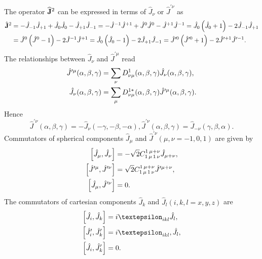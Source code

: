 The operator $\widehat{\mathbf{J}}^{2}$ can be expressed in terms of $\widehat{J}_{\nu}$ or $\widehat{J}^{\prime \nu}$ as
\begin{align}
\hat{\mathbf{J}}^{2} & =-\hat{J}_{-1} \hat{J}_{+1}+\hat{J}_{0} \hat{J}_{0}-\hat{J}_{+1} \hat{J}_{-1}=-\hat{J}^{-1} \hat{J}^{+1}+\hat{J}^{0} \hat{J}^{0}-\hat{J}^{+1} \hat{J}^{-1}=\hat{J}_{0}\left(\hat{J}_{0}+1\right)-2 \hat{J}_{-1} \hat{J}_{+1}  \notag\\
& =\hat{J}^{0}\left(\hat{J}^{0}-1\right)-2 \hat{J}^{-1} \hat{J}^{+1}=\hat{J}_{0}\left(\hat{J}_{0}-1\right)-2 \hat{J}_{+1} \hat{J}_{-1}=\hat{J}^{\prime0}\left(\hat{J}^{\prime0}+1\right)-2 \hat{J}^{\prime+1} \hat{J}^{\prime-1} .\label{eq:4:2:8}
\end{align}
The relationships between $\widehat{J}_{\nu}$ and $\widehat{J}^{\prime\mu}$ read
\begin{align}
\hat{J}^{\prime\mu}(\alpha, \beta, \gamma) & =\sum_{\nu} D_{\nu \mu}^{1}(\alpha, \beta, \gamma) \hat{J}_{\nu}(\alpha, \beta, \gamma),  \notag\\
\hat{J}_{\nu}(\alpha, \beta, \gamma) & =\sum_{\mu} D_{\nu \mu}^{1 *}(\alpha, \beta, \gamma) \hat{J}^{\prime\mu}(\alpha, \beta, \gamma). \label{eq:4:2:9}
\end{align}
Hence
\begin{equation}
\hat{J}^{\prime \nu}(\alpha, \beta, \gamma)=-\hat{J}_{\nu}(-\gamma,-\beta,-\alpha), \hat{J}^{\prime \nu}(\alpha, \beta, \gamma)=\hat{J}_{-\nu}(\gamma, \beta, \alpha) . \label{eq:4:2:10}
\end{equation}
Commutators of spherical components $\widehat{J}_{\mu}$ and $\widehat{J}^{\prime \nu}(\mu, \nu=-1,0,1)$ are given by
\begin{align}
{\left[\hat{J}_{\mu}, \hat{J}_{\nu}\right] } & =-\sqrt{2} C_{1\,\mu\,1\,\nu}^{1\,\mu+\nu} \hat{J}_{\mu+\nu} , \notag\\
{\left[\hat{J}^{\prime \mu}, \hat{J}^{\prime \nu}\right] } & =\sqrt{2} C_{1\,\mu\,1\,\nu}^{1\,\mu+\nu} \hat{J}^{\prime \mu+\nu},  \label{eq:4:2:11}\\
{\left[\hat{J}_{\mu}, \hat{J}^{\prime \nu}\right] } & =0. \notag
\end{align}
The commutators of cartesian components $\widehat{J}_{k}$ and $\widehat{J}_{l}(i, k, l=x, y, z)$ are
\begin{align}
\left[\hat{J}_{i}, \hat{J}_{k}\right]&=i \varepsilon_{i k l} \hat{J}_{l},  \notag\\
\left[\hat{J}^\prime_{i}, \hat{J}^\prime_{k}\right]&=i \varepsilon_{i k l}, \hat{J}_{l},  \label{eq:4:2:12}\\
\left[\hat{J}_{i}, \hat{J}^\prime_{k}\right]&=0. \notag
\end{align}
